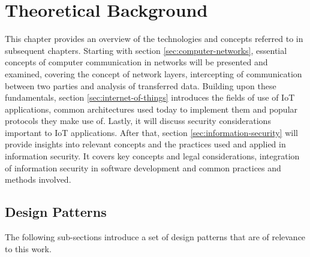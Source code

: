 \chapter{Theoretical Background}
\label{chap:theoretical-background}
This chapter provides an overview of the technologies and concepts referred to in subsequent chapters.
Starting with section \ref{sec:computer-networks}, essential concepts of computer communication in networks will be presented and examined, covering the concept of network layers, intercepting of communication between two parties and analysis of transferred data.
Building upon these fundamentals, section \ref{sec:internet-of-things} introduces the fields of use of \ac{IoT} applications, common architectures used today to implement them and popular protocols they make use of. Lastly, it will discuss security considerations important to \ac{IoT} applications.
After that, section \ref{sec:information-security} will provide insights into relevant concepts and the practices used and applied in information security. It covers key concepts and legal considerations, integration of information security in software development and common practices and methods involved. %


\section{Design Patterns}
The following sub-sections introduce a set of design patterns that are of relevance to this work.

